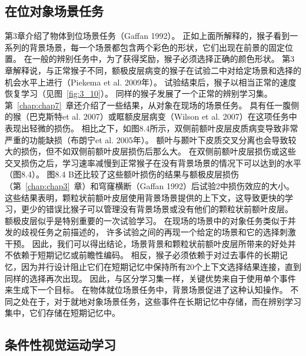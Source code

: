 \subsection{在位对象场景任务}


第3章介绍了物体到位场景任务（Gaffan 1992）。
正如上面所解释的，猴子看到一系列的背景场景，每一个场景都包含两个彩色的形状，它们出现在前景的固定位置。
在一般的辨别任务中，为了获得奖励，猴子必须选择正确的颜色形状。
第3章解释说，与正常猴子不同，额极皮层病变的猴子在试验二中对给定场景和选择的机会水平上进行（Piekema et al. 2009年）。
试验结束后，猴子以相当正常的速度恢复学习（见图~\ref{fig:3_10}）。
同样的猴子发展了一个正常的辨别学习集。
第~\ref{chap:chap7}~章还介绍了一些结果，从对象在现场的场景任务。
具有任一腹侧的猴（巴克斯特et al. 2007）或眶额皮层病变（Wilson et al. 2007）在这项任务中表现出轻微的损伤。
相比之下，如图8.4所示，双侧前额叶皮层皮质病变导致非常严重的功能缺损（布朗宁et al. 2005年）。
额叶与颞叶下皮质交叉分离也会导致较大的损伤，但不如双侧前额叶皮层损伤后那么大。
在双侧前额叶皮层损伤或这些交叉损伤之后，学习速率减慢到正常猴子在没有背景场景的情况下可以达到的水平（图8.4）。
图8.4 B还比较了这些额叶损伤的结果与额极皮层损伤（第~\ref{chap:chap3}~章）和穹窿横断（Gaffan 1992）后试验2中损伤效应的大小。
这些结果表明，颗粒状前额叶皮层使用背景场景提供的上下文，这导致更快的学习，更少的错误比猴子可以管理没有背景场景或没有他们的颗粒状前额叶皮层。
额极皮层似乎是特别重要的一次试验学习。
在现场的场景中的对象任务类似于并发的歧视任务之前描述的，
许多试验之间的再现一个给定的场景和它的选择刺激干预。
因此，我们可以得出结论，场景背景和颗粒状前额叶皮层所带来的好处并不依赖于短期记忆或前瞻性编码。
相反，猴子必须依赖于对过去事件的长期记忆，因为并行设计阻止它们在短期记忆中保持所有20个上下文选择结果连接，直到同样的选择再次出现。
因此，与区分学习集一样，关键优势来自于使用单个事件来生成下一个目标。
在物体就位场景任务中，背景场景促进了这种认知操作。
不同之处在于，对于就地对象场景任务，这些事件在长期记忆中存储，而在辨别学习集中，它们存储在短期记忆中。



\subsection{条件性视觉运动学习}

